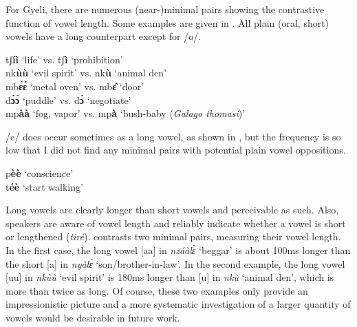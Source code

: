 \noindent For Gyeli, there are numerous (near-)minimal pairs showing the contrastive function of vowel length. Some examples are given in . All plain (oral, short) vowels have a long counterpart except for /o/.

\ea \label{LongV}
tʃ{\bfseries íì} `life' vs. tʃ{\bfseries ì} `prohibition' \\
nk{\bfseries ùù} `evil spirit' vs. nk{\bfseries ù} `animal den' \\
mb{\bfseries ɛ́ɛ́} `metal oven' vs. mb{\bfseries ɛ̂} `door' \\
d{\bfseries ɔ̀ɔ̀} `puddle' vs. d{\bfseries ɔ̀} `negotiate' \\
mp{\bfseries àà} `fog, vapor' vs. mp{\bfseries à} `bush-baby ({\itshape Galago thomasi})' \\
\z

/e/ does occur sometimes as a long vowel, as shown in , but the frequency is so low that I did not find any minimal pairs with potential plain vowel oppositions.

\ea \label{Longe}
p{\bfseries èè} `conscience' \\
t{\bfseries éè} `start walking'
\z

Long vowels are clearly longer than short vowels and perceivable as such. Also, speakers are aware of vowel length and reliably indicate whether a vowel is short or lengthened ({\itshape tiré}).  contrasts two minimal pairs, measuring their vowel length. In the first case, the long vowel [aa] in {\itshape nzáàlɛ̀} `beggar' is about 100ms longer than the short [a] in {\itshape nyàlɛ́} `son/brother-in-law'. In the second example, the long vowel [uu] in {\itshape nkùù} `evil spirit' is 180ms longer than [u] in {\itshape nkù} `animal den', which is more than twice as long. Of course, these two examples only provide an impressionistic picture and a more systematic investigation of a larger quantity of vowels would be desirable in future work.


